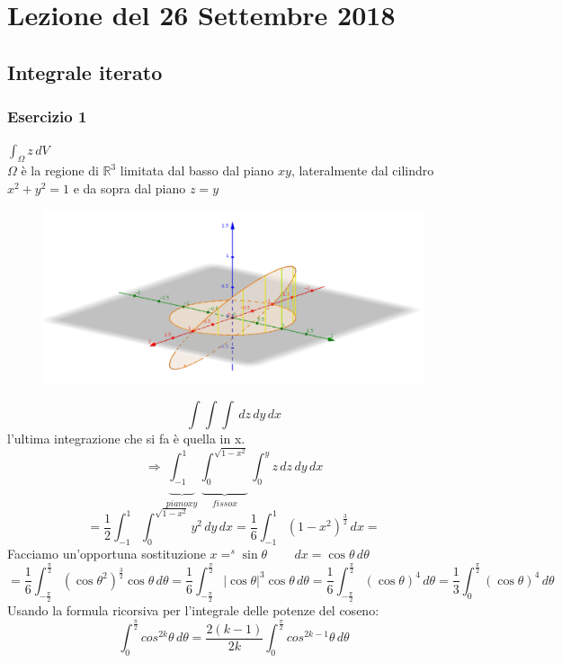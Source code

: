 \documentclass[10pt]{article}
\theoremstyle{plain}
\theoremstyle{definition}
\begin{document}
\section{Lezione del 26 Settembre 2018}
\subsection{Integrale iterato}
\subsubsection{Esercizio 1}
 
$\int_{\Omega}z\,dV$ \\ $\Omega$ è la regione di $\mathbb{R}^3$ limitata dal basso dal piano $xy$, lateralmente dal cilindro $x^2+y^2=1$ e da sopra dal piano $z=y$
\begin{figure}[ht]
\centering
\centerline{\includegraphics[width=140 mm,scale=1]{latex_img1.png}}
\label{fig: }
\end{figure}
$$\int\int\int \,dz\,dy\,dx$$ l'ultima integrazione che si fa è quella in x.
$$\Rightarrow \underbrace{\int_{-1}^{1}}_{piano xy} \underbrace{\int_{0}^{\sqrt{1-x^2}}}_{fisso x} \int_{0}^{y} z \,dz \,dy \,dx $$
$$=\frac{1}{2} \int_{-1}^{1} \int_{0}^{\sqrt{1-x^2}} y^2 \,dy \,dx = \frac{1}{6} \int_{-1}^{1} (1-x^2)^{\frac{3}{2}} \,dx =$$
Facciamo un'opportuna sostituzione \qquad $x =^s \sin{\theta} \qquad \,dx = \cos{\theta} \,d\theta$
$$= \frac{1}{6} \int_{-\frac{\pi}{2}}^{\frac{\pi}{2}} (\cos{\theta}^2)^{\frac{3}{2}} \cos{\theta} \,d\theta = \frac{1}{6} \int_{-\frac{\pi}{2}}^{\frac{\pi}{2}} |\cos{\theta}|^3 \cos{\theta} \,d\theta = \frac{1}{6} \int_{-\frac{\pi}{2}}^{\frac{\pi}{2}} (\cos{\theta})^4 \,d\theta = \frac{1}{3} \int_{0}^{\frac{\pi}{2}} (\cos{\theta})^4 \,d\theta$$
Usando la formula ricorsiva per l'integrale delle potenze del coseno:
$$\int_{0}^{\frac{\pi}{2}} cos^{2k}\theta \,d\theta = \frac{2(k-1)}{2k} \int_{0}^{\frac{\pi}{2}} cos^{2k-1}\theta \,d\theta$$
\end{document}
